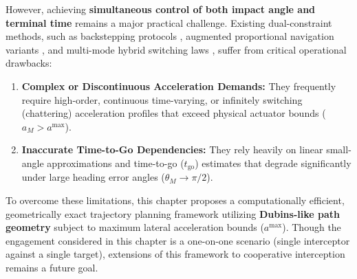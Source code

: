 However, achieving \textbf{simultaneous control of both impact angle and terminal time} remains a major practical challenge. Existing dual-constraint methods, such as backstepping protocols \cite{Jung2006}, augmented proportional navigation variants \cite{Zhang2013, Zhang2015}, and multi-mode hybrid switching laws \cite{Harrison2012}, suffer from critical operational drawbacks:
\begin{enumerate}
    \item \textbf{Complex or Discontinuous Acceleration Demands:} They frequently require high-order, continuous time-varying, or infinitely switching (chattering) acceleration profiles that exceed physical actuator bounds ($a_M > a^{\max}$).
    \item \textbf{Inaccurate Time-to-Go Dependencies:} They rely heavily on linear small-angle approximations and time-to-go ($t_{\text{go}}$) estimates that degrade significantly under large heading error angles ($\theta_M \to \pi/2$).
\end{enumerate}

To overcome these limitations, this chapter proposes a computationally efficient, geometrically exact trajectory planning framework utilizing \textbf{Dubins-like path geometry} subject to maximum lateral acceleration bounds ($a^{\max}$). Though the engagement considered in this chapter is a one-on-one scenario (single interceptor against a single target), extensions of this framework to cooperative interception remains a future goal. 

